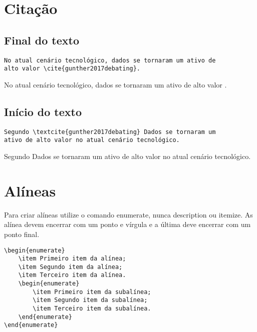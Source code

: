 \section{Citação}

\subsection{Final do texto}
\begin{verbatim}
No atual cenário tecnológico, dados se tornaram um ativo de 
alto valor \cite{gunther2017debating}.
\end{verbatim}

No atual cenário tecnológico, dados se tornaram um ativo de alto valor \cite{gunther2017debating}.

\subsection{Início do texto}
\begin{verbatim}
Segundo \textcite{gunther2017debating} Dados se tornaram um 
ativo de alto valor no atual cenário tecnológico.
\end{verbatim}

Segundo \textcite{gunther2017debating} Dados se tornaram um ativo de alto valor no atual cenário tecnológico.

\section{Alíneas}
Para criar alíneas utilize o comando enumerate, nunca description ou itemize. As alínea devem encerrar com um ponto e vírgula e a última deve encerrar com um ponto final.

\begin{verbatim}
\begin{enumerate}
    \item Primeiro item da alínea;
    \item Segundo item da alínea;
    \item Terceiro item da alínea.
    \begin{enumerate}
        \item Primeiro item da subalínea;
        \item Segundo item da subalínea;
        \item Terceiro item da subalínea.
    \end{enumerate}
\end{enumerate}
\end{verbatim}

